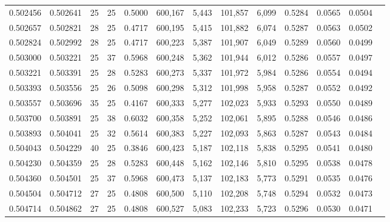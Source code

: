 \begin{tabular}{rrrrrrrrrrrrr}
0.502456 & 0.502641 &    25 &  25 &                                     0.5000 & 600,167 &   5,443 & 101,857 &   6,099 & 0.5284 & 0.0565 & 0.0504 \\
0.502657 & 0.502821 &    28 &  25 &                                     0.4717 & 600,195 &   5,415 & 101,882 &   6,074 & 0.5287 & 0.0563 & 0.0502 \\
0.502824 & 0.502992 &    28 &  25 &                                     0.4717 & 600,223 &   5,387 & 101,907 &   6,049 & 0.5289 & 0.0560 & 0.0499 \\
0.503000 & 0.503221 &    25 &  37 &                                     0.5968 & 600,248 &   5,362 & 101,944 &   6,012 & 0.5286 & 0.0557 & 0.0497 \\
0.503221 & 0.503391 &    25 &  28 &                                     0.5283 & 600,273 &   5,337 & 101,972 &   5,984 & 0.5286 & 0.0554 & 0.0494 \\
0.503393 & 0.503556 &    25 &  26 &                                     0.5098 & 600,298 &   5,312 & 101,998 &   5,958 & 0.5287 & 0.0552 & 0.0492 \\
0.503557 & 0.503696 &    35 &  25 &                                     0.4167 & 600,333 &   5,277 & 102,023 &   5,933 & 0.5293 & 0.0550 & 0.0489 \\
0.503700 & 0.503891 &    25 &  38 &                                     0.6032 & 600,358 &   5,252 & 102,061 &   5,895 & 0.5288 & 0.0546 & 0.0486 \\
0.503893 & 0.504041 &    25 &  32 &                                     0.5614 & 600,383 &   5,227 & 102,093 &   5,863 & 0.5287 & 0.0543 & 0.0484 \\
0.504043 & 0.504229 &    40 &  25 &                                     0.3846 & 600,423 &   5,187 & 102,118 &   5,838 & 0.5295 & 0.0541 & 0.0480 \\
0.504230 & 0.504359 &    25 &  28 &                                     0.5283 & 600,448 &   5,162 & 102,146 &   5,810 & 0.5295 & 0.0538 & 0.0478 \\
0.504360 & 0.504501 &    25 &  37 &                                     0.5968 & 600,473 &   5,137 & 102,183 &   5,773 & 0.5291 & 0.0535 & 0.0476 \\
0.504504 & 0.504712 &    27 &  25 &                                     0.4808 & 600,500 &   5,110 & 102,208 &   5,748 & 0.5294 & 0.0532 & 0.0473 \\
0.504714 & 0.504862 &    27 &  25 &                                     0.4808 & 600,527 &   5,083 & 102,233 &   5,723 & 0.5296 & 0.0530 & 0.0471 \\

\end{tabular}
